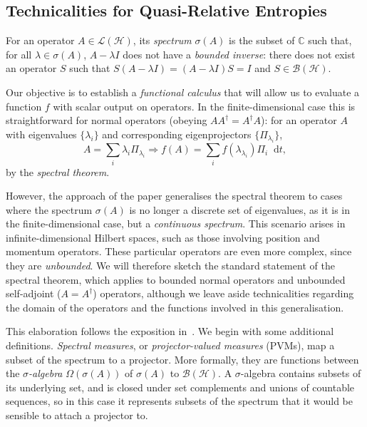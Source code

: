 \documentclass[10pt, a4paper]{article}
\numberwithin{equation}{section} %
\theoremstyle{definition}
\theoremstyle{plain}
\newcommand{\dif}{\mathop{}\!\mathrm{d}} %
\newcommand{\?}{\mathrel{?}} %
\newcommand{\C}{\mathbb{C}} %
\newcommand{\Hs}{\mathcal{H}} %
\begin{document}
    \begin{appendices}
      \section{Technicalities for Quasi-Relative Entropies}\label{sec:qretech}

      For an operator \(A \in \mathcal{L}(\Hs)\), its \emph{spectrum} \(\sigma(A)\) is the subset of \(\C\) such that, for all \(\lambda \in \sigma(A)\), \(A - \lambda I\) does not have a \emph{bounded inverse}: there does not exist an operator \(S\) such that \(S\left( A - \lambda I \right) = \left( A - \lambda I \right)S =  I\) and \(S \in \mathcal{B}(\Hs)\).

      Our objective is to establish a \emph{functional calculus} that will allow us to evaluate a function  \(f\) with scalar output on operators. In the finite-dimensional case this is straightforward for normal operators (obeying \(AA^{\dagger} = A^{\dagger}A\)): for an operator \(A\) with eigenvalues \(\{\lambda_i\}\) and corresponding eigenprojectors \(\{\Pi_{\lambda_i}\}\),
      \[ A = \sum_i \lambda_i \Pi_{\lambda_i} \Rightarrow f(A) = \sum_i f(\lambda_{\lambda_i}) \Pi_i \dif{t}, \]
      by the \emph{spectral theorem}.

      However, the approach of the paper generalises the spectral theorem to cases where the spectrum \(\sigma(A)\) is no longer a discrete set of eigenvalues, as it is in the finite-dimensional case, but a \emph{continuous spectrum}. This scenario arises in infinite-dimensional Hilbert spaces, such as those involving position and momentum operators. These particular operators are even more complex, since they are \emph{unbounded}. We will therefore sketch the standard statement of the spectral theorem, which applies to bounded normal operators and unbounded self-adjoint (\(A = A^{\dagger}\)) operators, although we leave aside technicalities regarding the domain of the operators and the functions involved in this generalisation.

      This elaboration follows the exposition in~\cite{HallQuantumForMath}. We begin with some additional definitions. \emph{Spectral measures}, or \emph{projector-valued measures} (PVMs), map a subset of the spectrum to a projector. More formally, they are functions between the \emph{\(\sigma\)-algebra} \(\Omega(\sigma(A))\) of \(\sigma(A)\) to \(\mathcal{B}(\Hs)\). A \(\sigma\)-algebra contains subsets of its underlying set, and is closed under set complements and unions of countable sequences, so in this case it represents subsets of the spectrum that it would be sensible to attach a projector to.


\end{appendices}
\end{document}
